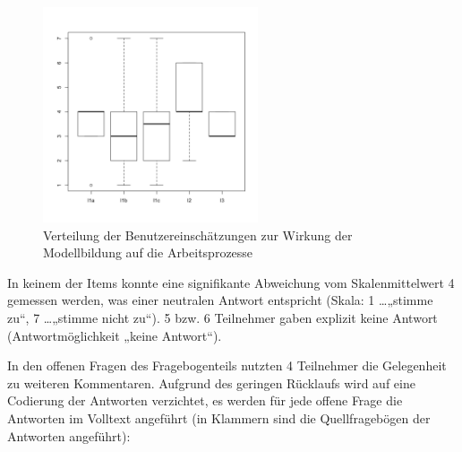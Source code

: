 \begin{figure}[htbp]
	\centering
		\includegraphics[height=2.5in]{img/Evaluierung/wirkung.png}
	\caption{Verteilung der Benutzereinschätzungen zur Wirkung der Modellbildung auf die Arbeitsprozesse}
	\label{fig:img_Evaluierung_wirkung}
\end{figure}

In keinem der Items konnte eine signifikante Abweichung vom Skalenmittelwert 4 gemessen werden, was einer neutralen Antwort entspricht (Skala: 1 \ldots „stimme zu“, 7 \ldots „stimme nicht zu“). 5 bzw. 6 Teilnehmer gaben explizit keine Antwort (Antwortmöglichkeit „keine Antwort“).

In den offenen Fragen des Fragebogenteils nutzten 4 Teilnehmer die Gelegenheit zu weiteren Kommentaren. Aufgrund des geringen Rücklaufs wird auf eine Codierung der Antworten verzichtet, es werden für jede offene Frage die Antworten im Volltext angeführt (in Klammern sind die Quellfragebögen der Antworten angeführt):


